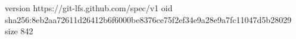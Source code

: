 version https://git-lfs.github.com/spec/v1
oid sha256:8eb2aa72611d26412b6f6000be8376ce75f2ef34e9a28e9a7fc11047d5b28029
size 842
